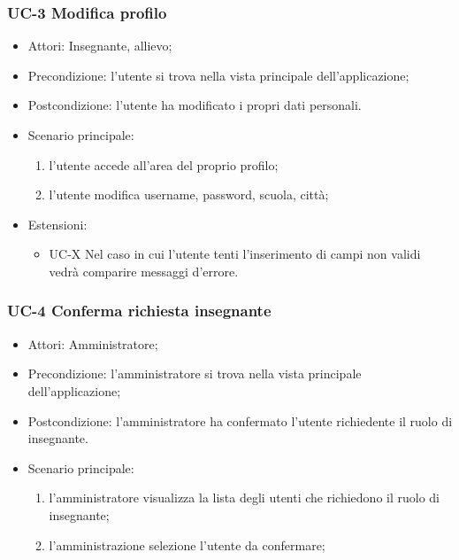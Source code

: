 	\subsubsection{UC-3 Modifica profilo}
		\begin{itemize}
			\item Attori: Insegnante, allievo;
			\item Precondizione: l'utente si trova nella vista principale dell'applicazione;
			\item Postcondizione: l'utente ha modificato i propri dati personali.
			\item Scenario principale:
				\begin{enumerate}
					\item l'utente accede all'area del proprio profilo;
					\item l'utente modifica username, password, scuola, città;
				\end{enumerate}
				\item Estensioni:
				\begin{itemize}
					\item UC-X Nel caso in cui l'utente tenti l'inserimento di campi non validi vedrà comparire messaggi d'errore.
				\end{itemize}
		\end{itemize}
		
	\subsubsection{UC-4 Conferma richiesta insegnante}
		\begin{itemize}
			\item Attori: Amministratore;
			\item Precondizione: l'amministratore si trova nella vista principale dell'applicazione;
			\item Postcondizione: l'amministratore ha confermato l'utente richiedente il ruolo di insegnante.
			\item Scenario principale:
				\begin{enumerate}
					\item l'amministratore visualizza la lista degli utenti che richiedono il ruolo di insegnante;
					\item l'amministrazione selezione l'utente da confermare;
				\end{enumerate}
		\end{itemize}
					
